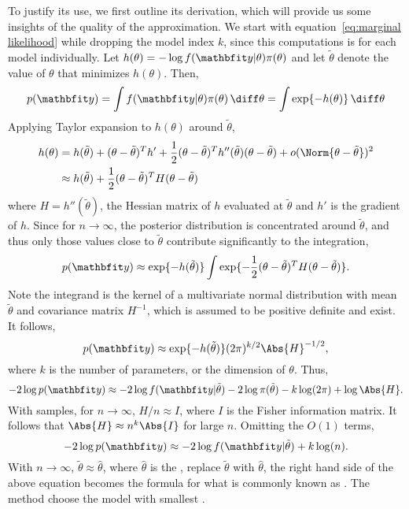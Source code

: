 To justify its use, we first outline its derivation, which will provide us
some insights of the quality of the approximation. We start with
equation~\eqref{eq:marginal likelihood} while dropping the model index $k$,
since this computations is for each model individually. Let $h(\theta) = -
\log f(\data|\theta)\pi(\theta)$ and let $\tilde\theta$ denote the value of
$\theta$ that minimizes $h(\theta)$. Then,
\begin{equation}
  p(\data) = \int f(\data|\theta)\pi(\theta)\intd\theta
  = \int\exp\{-h(\theta)\}\intd\theta
\end{equation}
Applying Taylor expansion to $h(\theta)$ around $\tilde\theta$,
\begin{align}
  h(\theta)
  &= h(\tilde\theta) + (\theta - \tilde\theta)^T h'
  + \frac{1}{2}(\theta - \tilde\theta)^T h''(\tilde\theta)
  (\theta - \tilde\theta)
  + o(\Norm{\theta - \tilde\theta})^2 \notag\\
  &\approx h(\tilde\theta) + \frac{1}{2}(\theta - \tilde\theta)^T
  H (\theta - \tilde\theta)
\end{align}
where $H = h''(\tilde\theta)$, the Hessian matrix of $h$ evaluated at
$\tilde\theta$ and $h'$ is the gradient of $h$. Since for $n\to\infty$, the
posterior distribution is concentrated around $\tilde\theta$, and thus only
those values close to $\tilde\theta$ contribute significantly to the
integration,
\begin{equation}
  p(\data)\approx\exp\{-h(\tilde\theta)\}
  \int\exp\{-\frac{1}{2}(\theta - \tilde\theta)^TH(\theta - \tilde\theta)\}.
\end{equation}
Note the integrand is the kernel of a multivariate normal distribution with
mean $\tilde\theta$ and covariance matrix $H^{-1}$, which is assumed to be
positive definite and exist. It follows,
\begin{equation}
  p(\data) \approx \exp\{-h(\tilde\theta)\} (2\pi)^{k/2} \Abs{H}^{-1/2},
\end{equation}
where $k$ is the number of parameters, or the dimension of $\theta$. Thus,
\begin{equation}
  -2\log p(\data) \approx
  -2\log f(\data|\tilde\theta) - 2\log\pi(\tilde\theta) - k\log(2\pi) +
  \log\Abs{H}.
  \label{eq:bic approx}
\end{equation}
With \iid samples, for $n\to\infty$, $H/n \approx I$, where $I$ is the Fisher
information matrix. It follows that $\Abs{H}\approx n^k \Abs{I}$ for
large $n$. Omitting the $O(1)$ terms,
\begin{equation}
  -2\log p(\data) \approx -2\log f(\data|\tilde\theta) + k\log(n).
\end{equation}
With $n\to\infty$, $\tilde\theta\approx\hat{\theta}$, where $\hat{\theta}$ is
the \mle, replace $\tilde\theta$ with $\hat{\theta}$, the right hand side of the
above equation becomes the formula for what is commonly known as \bic. The
\bic method choose the model with smallest \bic.

